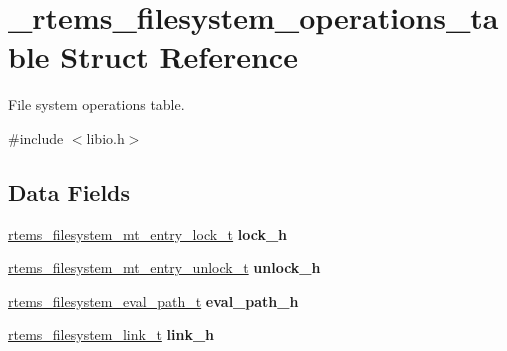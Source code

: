 \hypertarget{struct__rtems__filesystem__operations__table}{}\section{\+\_\+rtems\+\_\+filesystem\+\_\+operations\+\_\+table Struct Reference}
\label{struct__rtems__filesystem__operations__table}


File system operations table.  




{\ttfamily \#include $<$libio.\+h$>$}

\subsection*{Data Fields}
\begin{DoxyCompactItemize}
\item 
\mbox{\label{struct__rtems__filesystem__operations__table_a46c293781bafbdf8140085f3dade9fb5}} 
\mbox{\hyperlink{group__LibIOFSOps_gae6a0c55a60927170f228b90ede1032f9}{rtems\+\_\+filesystem\+\_\+mt\+\_\+entry\+\_\+lock\+\_\+t}} {\bfseries lock\+\_\+h}
\item 
\mbox{\label{struct__rtems__filesystem__operations__table_a5f1df1c42690df11625517849b66e4f1}} 
\mbox{\hyperlink{group__LibIOFSOps_ga9a04cab210f543206c54fc78877cb884}{rtems\+\_\+filesystem\+\_\+mt\+\_\+entry\+\_\+unlock\+\_\+t}} {\bfseries unlock\+\_\+h}
\item 
\mbox{\label{struct__rtems__filesystem__operations__table_a74304c8e77b461fb5f6fa4373a52c540}} 
\mbox{\hyperlink{group__LibIOFSOps_ga49260fbd8e55e1ecb71daef115c751c4}{rtems\+\_\+filesystem\+\_\+eval\+\_\+path\+\_\+t}} {\bfseries eval\+\_\+path\+\_\+h}
\item 
\mbox{\label{struct__rtems__filesystem__operations__table_a51ec8199b1cd1c4d629ed0eddfc1ad3b}} 
\mbox{\hyperlink{group__LibIOFSOps_ga13198d873ccc0493d7ba970d4429502f}{rtems\+\_\+filesystem\+\_\+link\+\_\+t}} {\bfseries link\+\_\+h}
\item 
\mbox{\label{struct__rtems__filesystem__operations__table_ae8a3a26fb424da294673003eb947ea39}} 

\end{DoxyCompactItemize}
